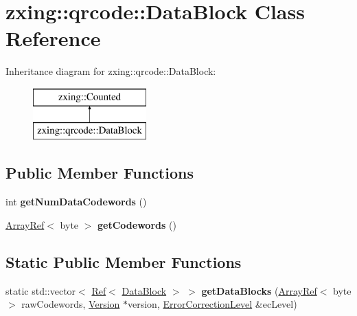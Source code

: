 \hypertarget{classzxing_1_1qrcode_1_1_data_block}{}\section{zxing\+:\+:qrcode\+:\+:Data\+Block Class Reference}
\label{classzxing_1_1qrcode_1_1_data_block}
Inheritance diagram for zxing\+:\+:qrcode\+:\+:Data\+Block\+:\begin{figure}[H]
\begin{center}
\leavevmode
\includegraphics[height=2.000000cm]{classzxing_1_1qrcode_1_1_data_block}
\end{center}
\end{figure}
\subsection*{Public Member Functions}
\begin{DoxyCompactItemize}
\item 
\mbox{\label{classzxing_1_1qrcode_1_1_data_block_a536a3aec7249fa4db45e29759223ecae}} 
int {\bfseries get\+Num\+Data\+Codewords} ()
\item 
\mbox{\label{classzxing_1_1qrcode_1_1_data_block_a8b072c30fdabe7dce6cebf0c879b9ae4}} 
\mbox{\hyperlink{classzxing_1_1_array_ref}{Array\+Ref}}$<$ byte $>$ {\bfseries get\+Codewords} ()
\end{DoxyCompactItemize}
\subsection*{Static Public Member Functions}
\begin{DoxyCompactItemize}
\item 
\mbox{\label{classzxing_1_1qrcode_1_1_data_block_a9e6c46e2a3d30d75cbdc31159b8895ff}} 
static std\+::vector$<$ \mbox{\hyperlink{classzxing_1_1_ref}{Ref}}$<$ \mbox{\hyperlink{classzxing_1_1qrcode_1_1_data_block}{Data\+Block}} $>$ $>$ {\bfseries get\+Data\+Blocks} (\mbox{\hyperlink{classzxing_1_1_array_ref}{Array\+Ref}}$<$ byte $>$ raw\+Codewords, \mbox{\hyperlink{classzxing_1_1qrcode_1_1_version}{Version}} $\ast$version, \mbox{\hyperlink{classzxing_1_1qrcode_1_1_error_correction_level}{Error\+Correction\+Level}} \&ec\+Level)
\end{DoxyCompactItemize}


